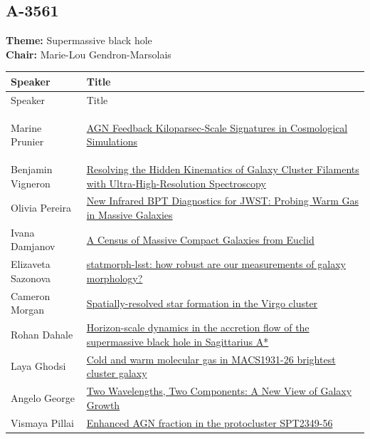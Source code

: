 \subsection*{A-3561}
\textbf{Theme:} Supermassive black hole\\
\textbf{Chair:} Marie-Lou Gendron-Marsolais\\
{\small
{}
\sloppy
\setlength{\emergencystretch}{1em}
\begin{longtable}{@{}>{\TableRaggedRight\arraybackslash\hspace{0pt}}p{} >{\TableRaggedRight\arraybackslash\hspace{0pt}}p{}@{}}
\toprule
Speaker & Title \\
\midrule
\endfirsthead
\toprule
Speaker & Title \\
\midrule
\endhead
\hypertarget{schedule-talk-18}{}\label{schedule-page-talk-18}Marine Prunier & \hyperlink{abstract-talk-18}{AGN Feedback Kiloparsec-Scale Signatures in Cosmological Simulations} \\
\hypertarget{schedule-talk-5}{}\label{schedule-page-talk-5}Benjamin Vigneron & \hyperlink{abstract-talk-5}{Resolving the Hidden Kinematics of Galaxy Cluster Filaments with Ultra-High-Resolution Spectroscopy} \\
\hypertarget{schedule-talk-184}{}\label{schedule-page-talk-184}Olivia Pereira & \hyperlink{abstract-talk-184}{New Infrared BPT Diagnostics for JWST: Probing Warm Gas in Massive Galaxies} \\
\hypertarget{schedule-talk-329}{}\label{schedule-page-talk-329}Ivana Damjanov & \hyperlink{abstract-talk-329}{A Census of Massive Compact Galaxies from Euclid} \\
\hypertarget{schedule-talk-203}{}\label{schedule-page-talk-203}Elizaveta Sazonova & \hyperlink{abstract-talk-203}{statmorph-lsst: how robust are our measurements of galaxy morphology?} \\
\hypertarget{schedule-talk-321}{}\label{schedule-page-talk-321}Cameron Morgan & \hyperlink{abstract-talk-321}{Spatially-resolved star formation in the Virgo cluster} \\
\hypertarget{schedule-talk-19}{}\label{schedule-page-talk-19}Rohan Dahale & \hyperlink{abstract-talk-19}{Horizon-scale dynamics in the accretion flow of the supermassive black hole in Sagittarius A*} \\
\hypertarget{schedule-talk-145}{}\label{schedule-page-talk-145}Laya Ghodsi & \hyperlink{abstract-talk-145}{Cold and warm molecular gas in MACS1931-26 brightest cluster galaxy} \\
\hypertarget{schedule-talk-51}{}\label{schedule-page-talk-51}Angelo George & \hyperlink{abstract-talk-51}{Two Wavelengths, Two Components: A New View of Galaxy Growth} \\
\hypertarget{schedule-talk-327}{}\label{schedule-page-talk-327}Vismaya Pillai & \hyperlink{abstract-talk-327}{Enhanced AGN fraction in the protocluster SPT2349-56} \\
\bottomrule
\end{longtable}
}

